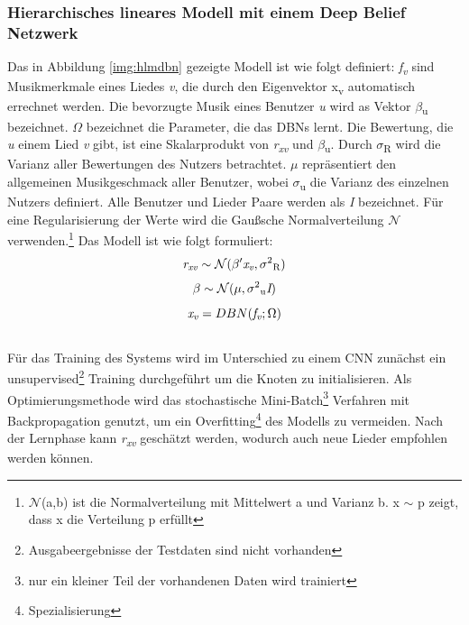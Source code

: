 \documentclass[twosided,a4,10pt]{article}
\begin{document}
\begin{multicols}{2}
		\subsubsection{Hierarchisches lineares Modell mit einem Deep Belief Netzwerk}
		Das in Abbildung \ref{img:hlmdbn} gezeigte Modell ist wie folgt definiert: \textit{f\textsubscript{v}} sind Musikmerkmale eines Liedes \textit{v}, die durch den Eigenvektor x\textsubscript{v} automatisch errechnet werden. Die bevorzugte Musik eines Benutzer \textit{u} wird as Vektor $\beta$\textsubscript{u} bezeichnet. $\Omega$ bezeichnet die Parameter, die das DBNs lernt. Die Bewertung, die \textit{u} einem Lied \textit{v} gibt, ist eine Skalarprodukt von \textit{r\textsubscript{xv}} und $\beta$\textsubscript{u}. Durch $\sigma$\textsubscript{R} wird die Varianz aller Bewertungen des Nutzers betrachtet. $\mu$ repräsentiert den allgemeinen Musikgeschmack aller Benutzer, wobei $\sigma$\textsubscript{u} die Varianz des einzelnen Nutzers definiert. Alle Benutzer und Lieder Paare werden als \textit{I} bezeichnet. Für eine Regularisierung der Werte wird die Gaußsche Normalverteilung $\mathcal{N}$ verwenden.\footnote[14]{$\mathcal{N}$(a,b) ist die Normalverteilung mit Mittelwert a und Varianz b. x $\sim$ p zeigt, dass x die Verteilung p erfüllt} \cite{wang}\newline Das Modell ist wie folgt formuliert:\newline
		\begin{equation*}
			\centering
			\textit{r\textsubscript{xv}}\sim\mathcal{N}(\beta'\textit{x\textsubscript{v}},\sigma\textsuperscript{2}\textsubscript{R})
		\end{equation*}
		\begin{equation*}
		\centering
			\beta\sim\mathcal{N}(\mu,\sigma\textsuperscript{2}\textsubscript{u}\textit{I})
		\end{equation*}
		\begin{equation*}
			\textit{x\textsubscript{v}} = DBN(\textit{f\textsubscript{v}};\Omega)
		\end{equation*}\newline\\
		Für das Training des Systems wird im Unterschied zu einem CNN zunächst ein unsupervised\footnote[15]{Ausgabeergebnisse der Testdaten sind nicht vorhanden} Training durchgeführt um die Knoten zu initialisieren. Als Optimierungsmethode wird das stochastische Mini-Batch\footnote[16]{nur ein kleiner Teil der vorhandenen Daten wird trainiert} Verfahren mit Backpropagation genutzt, um ein Overfitting\footnote[17]{Spezialisierung} des Modells zu vermeiden. Nach der Lernphase kann \textit{r\textsubscript{xv}} geschätzt werden, wodurch auch neue Lieder empfohlen werden können. \cite{wang}
		

\end{multicols}
\end{document}
